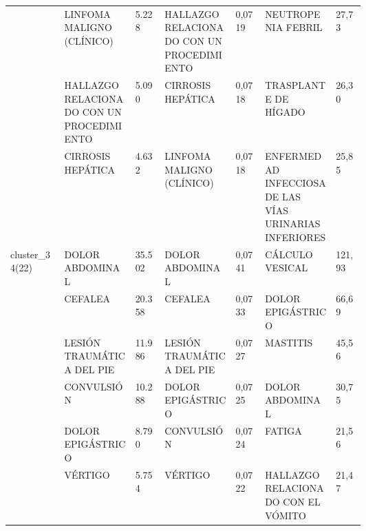 \begin{landscape}
\begin{longtable}[c]{@{}lp{0.2\linewidth}lp{0.2\linewidth}lp{0.2\linewidth}l@{}}
                                  & LINFOMA MALIGNO (CLÍNICO)                                     & 5.228  & HALLAZGO RELACIONADO CON UN PROCEDIMIENTO              & 0,0719 & NEUTROPENIA FEBRIL                                            & 27,73    \\
                                  & HALLAZGO RELACIONADO CON UN PROCEDIMIENTO                     & 5.090  & CIRROSIS HEPÁTICA                                      & 0,0718 & TRASPLANTE DE HÍGADO                                          & 26,30    \\
                                  & CIRROSIS HEPÁTICA                                             & 4.632  & LINFOMA MALIGNO (CLÍNICO)                              & 0,0718 & ENFERMEDAD INFECCIOSA DE LAS VÍAS URINARIAS INFERIORES        & 25,85    \\
\multirow{10}{*}{cluster\_34(22)} & DOLOR ABDOMINAL                                               & 35.502 & DOLOR ABDOMINAL                                        & 0,0741 & CÁLCULO VESICAL                                               & 121,93   \\
                                  & CEFALEA                                                       & 20.358 & CEFALEA                                                & 0,0733 & DOLOR EPIGÁSTRICO                                             & 66,69    \\
                                  & LESIÓN TRAUMÁTICA DEL PIE                                     & 11.986 & LESIÓN TRAUMÁTICA DEL PIE                              & 0,0727 & MASTITIS                                                      & 45,56    \\
                                  & CONVULSIÓN                                                    & 10.288 & DOLOR EPIGÁSTRICO                                      & 0,0725 & DOLOR ABDOMINAL                                               & 30,75    \\
                                  & DOLOR EPIGÁSTRICO                                             & 8.790  & CONVULSIÓN                                             & 0,0724 & FATIGA                                                        & 21,56    \\
                                  & VÉRTIGO                                                       & 5.754  & VÉRTIGO                                                & 0,0722 & HALLAZGO RELACIONADO CON EL VÓMITO                            & 21,47    \\

\end{longtable}
\end{landscape}
